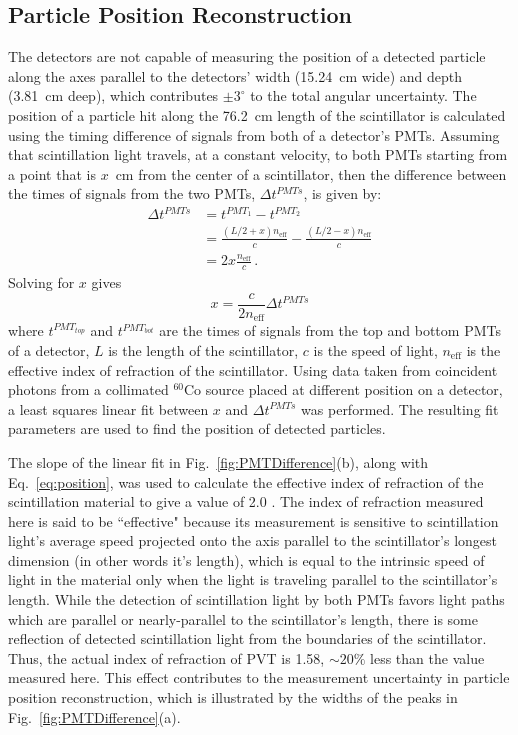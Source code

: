 \subsection{Particle Position Reconstruction}
The detectors are not capable of measuring the position of a detected particle along the axes parallel to the detectors' width (15.24~cm wide) and depth (3.81~cm deep), which contributes $\pm3^{\circ}$ to the total angular uncertainty.
The position of a particle hit along the 76.2~cm length of the scintillator is calculated using the timing difference of signals from both of a detector's PMTs.
Assuming that scintillation light travels, at a constant velocity, to both PMTs starting from a point that is $x$~cm from the center of a scintillator, then the difference between the times of signals from the two PMTs, $\Delta t^{PMTs}$, is given by:
\begin{equation}
\begin{split}
\Delta t^{PMTs} & = t^{PMT_1}-t^{PMT_2} \\ 
& = \frac{(L/2 + x) n_{\text{eff}}}{c} - \frac{(L/2-x) n_{\text{eff}}}{c} \\
& = 2x \frac{n_{\text{eff}}}{c}  \, .
\end{split}
\end{equation}
Solving for $x$ gives 
\begin{equation}
\label{eq:position}
x = \frac{c}{2n_{\text{eff}}} \Delta t^{PMTs} 
\end{equation}
where $t^{PMT_{top}}$ and $t^{PMT_{bot}}$ are the times of signals from the top and bottom PMTs of a detector, $L$ is the length of the scintillator, $c$ is the speed of light, $n_{\text{eff}}$ is the effective index of refraction of the scintillator.
Using data taken from coincident photons from a collimated $^{60}$Co source placed at different position on a detector, a least squares linear fit between $x$ and $\Delta t^{PMTs}$ was performed.
The resulting fit parameters are used to find the position of detected particles.

The slope of the linear fit in Fig.~\ref{fig:PMTDifference}(b), along with Eq.~\ref{eq:position}, was used to calculate the effective index of refraction of the scintillation material to give a value of 2.0 .
The index of refraction measured here is said to be ``effective" because its measurement is sensitive to scintillation light's average speed projected onto the axis parallel to the scintillator's longest dimension (in other words it's length), which is equal to the intrinsic speed of light in the material only when the light is traveling parallel to the scintillator's length.
While the detection of scintillation light by both PMTs favors light paths which are parallel or nearly-parallel to the scintillator's length, there is some reflection of detected scintillation light from the boundaries of the scintillator.
Thus, the actual index of refraction of PVT is 1.58, $\sim{20}\%$ less than the value measured here.
This effect contributes to the measurement uncertainty in particle position reconstruction, which is illustrated by the widths of the peaks in Fig.~\ref{fig:PMTDifference}(a).


